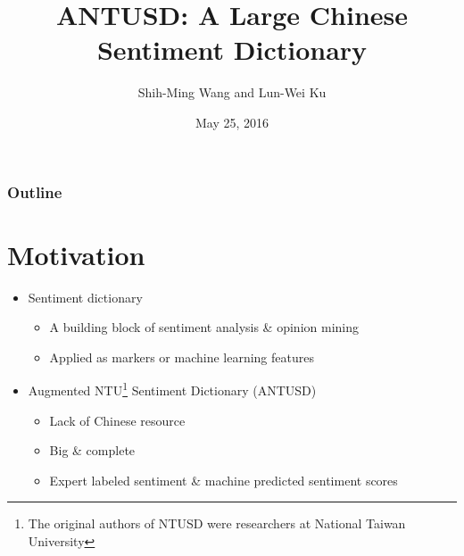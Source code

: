 \documentclass[compress]{beamer}
\title{ANTUSD: A Large Chinese Sentiment Dictionary }
\author{Shih-Ming Wang and Lun-Wei Ku}
\institute{NLPLab, Institute of Information Science, Academia Sinica}
\date{May 25, 2016}
\begin{document}
\beamertemplatenavigationsymbolsempty

\begin{frame}
    \maketitle
\end{frame}

\begin{frame}
    \frametitle{Outline}
    \tableofcontents
\end{frame}
\section{Motivation}
    \begin{frame}{\secname}
        \begin{itemize}
            \item Sentiment dictionary
            \begin{itemize}
                \item A building block of sentiment analysis \& opinion mining
                \item Applied as markers or machine learning features
            \end{itemize}
            \item Augmented NTU\footnote{The original authors of NTUSD were researchers at National Taiwan University} Sentiment Dictionary (ANTUSD)
            \begin{itemize}
                \item Lack of Chinese resource
                \item Big \& complete
                \item Expert labeled sentiment \& machine predicted sentiment scores
            \end{itemize}
        \end{itemize}
    \end{frame}
\end{document}
